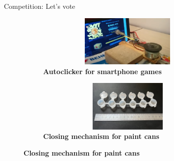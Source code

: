 \documentclass[aspectratio=169]{beamer}
\begin{document}
\begin{frame}[c]{Competition: Let's vote}
\begin{figure}[H]
        \begin{subfigure}[t]{0.49\textwidth}
            \centering\includegraphics[height=2.5cm,width=1\textwidth,keepaspectratio]{2024-06-04_23-36-11.png}
            \caption{\textbf{Autoclicker for smartphone games}}
        \end{subfigure}
        \begin{subfigure}[t]{0.49\textwidth}
            \centering\includegraphics[height=2.5cm,width=1\textwidth,keepaspectratio]{2024-06-04_23-34-01.png}
            \caption{\textbf{Closing mechanism for paint cans}}
        \end{subfigure}
    \end{figure}
\end{frame}
\end{document}
